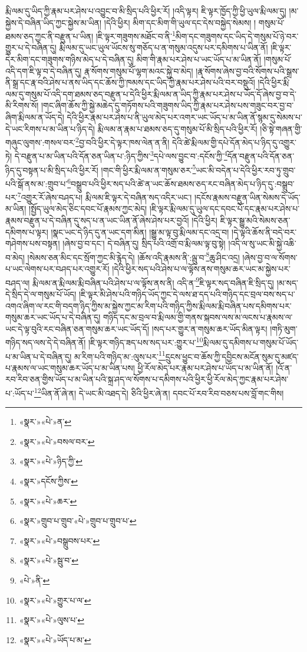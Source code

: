 རྨི་ལམ་དུ་ཡིད་ཀྱི་རྣམ་པར་ཤེས་པ་འབྱུང་བ་མི་སྲིད་པའི་ཕྱིར་རོ། །འདི་ལྟར། ཇི་ལྟར་ཁྱོད་ཀྱི་ཕྱི་ཡུལ་རྨི་ལམ་དུ། །མ་སྐྱེས་དེ་བཞིན་ཡིད་ཀྱང་སྐྱེས་མ་ཡིན། །དེའི་ཕྱིར། མིག་དང་མིག་གི་ཡུལ་དང་དེས་བསྐྱེད་སེམས། །
གསུམ་པོ་ཐམས་ཅད་ཀྱང་ནི་བརྫུན་པ་ཡིན། །ཇི་ལྟར་གཟུགས་མཐོང་བ་ནི་\footnote{«སྣར་»«པེ་»ན་}མིག་དང་གཟུགས་དང་ཡིད་དེ་གསུམ་པོ་ཉེ་བར་གྱུར་པ་དེ་བཞིན་དུ། རྨི་ལམ་དུ་ཡང་ཡུལ་ཡོངས་སུ་གཅོད་པ་ན་གསུམ་འདུས་པར་དམིགས་པ་ཡིན་ནོ། །ཇི་ལྟར་དེར་མིག་དང་གཟུགས་གཉིས་མེད་པ་དེ་བཞིན་དུ། མིག་གི་རྣམ་པར་ཤེས་པ་ཡང་ཡོད་པ་མ་ཡིན་ནོ། །གསུམ་པོ་འདི་དག་ཇི་ལྟ་བ་དེ་བཞིན་དུ། རྣ་སོགས་གསུམ་པོ་ལྷག་མའང་སྐྱེ་བ་མེད། །རྣ་སོགས་ཞེས་བྱ་བའི་སོགས་པའི་སྒྲས་ནི་སྒྲ་དང་རྣ་བའི་ཤེས་པ་ནས་ཡིད་དང་ཆོས་ཀྱི་ཁམས་དང་ཡིད་ཀྱི་རྣམ་པར་ཤེས་པའི་བར་བསྡུའོ། །དེའི་ཕྱིར་རྨི་ལམ་དུ་གསུམ་པོ་འདི་དག་ཐམས་ཅད་བརྫུན་པ་དེའི་ཕྱིར་རྨི་ལམ་ན་ཡིད་ཀྱི་རྣམ་པར་ཤེས་པ་ཡོད་དོ་ཞེས་བྱ་བ་དེ་མི་རིགས་སོ། །གང་ཞིག་ཆོས་ཀྱི་སྐྱེ་མཆེད་དུ་གཏོགས་པའི་གཟུགས་ཡིད་ཀྱི་རྣམ་པར་ཤེས་པས་གཟུང་བར་བྱ་བ་ཞིག་རྨི་ལམ་ན་ཡོད་དེ། དེའི་ཕྱིར་རྣམ་པར་ཤེས་པ་ནི་ཡུལ་མེད་པར་འགར་ཡང་ཡོད་པ་མ་ཡིན་ནོ་སྙམ་དུ་སེམས་པ་དེ་ཡང་རིགས་པ་མ་ཡིན་པ་ཉིད་དེ། རྨི་ལམ་ན་རྣམ་པ་ཐམས་ཅད་དུ་གསུམ་པོ་མི་སྲིད་པའི་ཕྱིར་རོ། །ཅི་སྟེ་གཞན་གྱི་གཞུང་ལུགས་:གསལ་བར་\footnote{«སྣར་»«པེ་»བསལ་བར་}བྱ་བའི་ཕྱིར་དེ་ལྟར་ཁས་ལེན་ན་ནི། དེའི་ཚེ་རྨི་ལམ་གྱི་དཔེ་དོན་མེད་པ་ཉིད་དུ་འགྱུར་ཏེ། དེ་བརྫུན་པ་མ་ཡིན་པའི་དོན་ཅན་ཡིན་པ་:ཉིད་ཀྱིས་\footnote{«སྣར་»«པེ་»ཉིད་ཀྱི་}དཔེ་ལས་བྱུང་བ་:དངོས་ཀྱི་\footnote{«སྣར་»དངོས་ཀྱིས་}དོན་བརྫུན་པའི་དོན་ཅན་ཉིད་དུ་བསྟན་པ་མི་སྲིད་པའི་ཕྱིར་རོ། །གང་གི་ཕྱིར་རྨི་ལམ་ན་གསུམ་ཅར་\footnote{«སྣར་»«པེ་»ཆར་}ཡང་མི་བདེན་པ་དེའི་ཕྱིར་རབ་ཏུ་གྲུབ་པའི་སྒོ་ནས་མ་:གྲུབ་པ་\footnote{«སྣར་»གྲུབ་པ་གྲུབ་«པེ་»གྲུབ་པ་གྲུབ་པ་}བསྒྲུབ་པའི་ཕྱིར་སད་པའི་ཚེ་ན་ཡང་ཆོས་ཐམས་ཅད་རང་བཞིན་མེད་པ་ཉིད་དུ་:བསྒྲུབ་པར་\footnote{«སྣར་»«པེ་»བསྒྲུབས་པར་}འགྱུར་རོ་ཞེས་བཤད་པ། རྨི་ལམ་ཇི་ལྟར་དེ་བཞིན་སད་འདིར་ཡང་། །དངོས་རྣམས་བརྫུན་ཡིན་སེམས་དེ་ཡོད་མ་ཡིན། །སྤྱོད་ཡུལ་མེད་ཅིང་དབང་པོ་རྣམས་ཀྱང་མེད། །ཇི་ལྟར་རྨི་ལམ་དུ་ཡུལ་དང་དབང་པོ་དང་རྣམ་པར་ཤེས་པ་རྣམས་བརྫུན་པ་དེ་བཞིན་དུ་སད་པ་ན་ཡང་ཡིན་ནོ་ཞེས་ཤེས་པར་བྱའོ། །དེའི་ཕྱིར། ཇི་ལྟར་སྒྱུ་མའི་སེམས་ཅན་དམིགས་པ་ལྟར། །སྣང་ཡང་དེ་ཉིད་དུ་ན་ཡང་དག་མིན། །སྒྱུ་མ་ལྟ་བུ་རྨི་ལམ་དང་འདྲ་བ། །དེ་ལྟའི་ཆོས་ནི་བདེ་བར་གཤེགས་པས་བསྟན། །ཞེས་བྱ་བ་དང་། དེ་བཞིན་དུ། སྲིད་པའི་འགྲོ་བ་རྨི་ལམ་ལྟ་བུ་སྟེ། །འདི་ལ་སུ་ཡང་མི་སྐྱེ་འཆི་བ་མེད། །སེམས་ཅན་མིང་དང་སྲོག་ཀྱང་མི་རྙེད་དེ། །ཆོས་འདི་རྣམས་ནི་:ལྦུ་བ་\footnote{«སྣར་»«པེ་»སྦུ་བ་}ཆུ་ཤིང་འདྲ། །ཞེས་བྱ་བ་ལ་སོགས་པ་ཡང་ལེགས་པར་བཤད་པར་འགྱུར་རོ། །དེའི་ཕྱིར་སད་པའི་ཤེས་པ་ལ་ལྟོས་ནས་གསུམ་ཆར་ཡང་མ་སྐྱེས་པར་བཤད་ལ། རྨི་ལམ་ན་རྨི་ལམ་རྨི་བཞིན་པའི་ཤེས་པ་ལ་ལྟོས་ནས་ནི། འདི་ན་\footnote{«པེ་»ནི་}ཇི་ལྟར་སད་བཞིན་ཇི་སྲིད་དུ། །མ་སད་དེ་སྲིད་དེ་ལ་གསུམ་པོ་ཡོད། །ཇི་ལྟར་མི་ཤེས་པའི་གཉིད་ཡོད་ཀྱང་དེ་ལས་ཐ་དད་པའི་གཉིད་དང་བྲལ་བས་སད་པ་འགའ་ཞིག་ལ་རང་གི་བདག་ཉིད་ཀྱིས་མ་སྐྱེས་ཀྱང་མ་རིག་པའི་གཉིད་ཀྱིས་རྨི་ལམ་རྨི་བཞིན་པས་དམིགས་པར་གསུམ་ཆར་ཡང་ཡོད་པ་དེ་བཞིན་དུ། གཉིད་དང་མ་བྲལ་བ་རྨི་ལམ་གྱི་གནས་སྐབས་ལས་མ་ལངས་པ་རྣམས་ལ་ཡང་དེ་ལྟ་བུའི་རང་བཞིན་ཅན་གསུམ་ཆར་ཡང་ཡོད་དོ། །སད་པར་གྱུར་ན་གསུམ་ཆར་ཡོད་མིན་ལྟར། །གཏི་མུག་གཉིད་སད་ལས་དེ་དེ་བཞིན་ནོ། །ཇི་ལྟར་གཉིད་ཟད་པས་སད་པར་:གྱུར་པ་\footnote{«སྣར་»«པེ་»གྱུར་པ་ལ་}རྨི་ལམ་དུ་དམིགས་པ་གསུམ་པོ་ཡོད་པ་མ་ཡིན་པ་དེ་བཞིན་དུ། མ་རིག་པའི་གཉིད་མ་:ལུས་པར་\footnote{«སྣར་»«པེ་»ལུས་པ་}དྲུངས་ཕྱུང་བ་ཆོས་ཀྱི་དབྱིངས་མངོན་སུམ་དུ་མཛད་པ་རྣམས་ལ་ཡང་གསུམ་ཆར་ཡོད་པ་མ་ཡིན་པས། ཕྱི་རོལ་མེད་པར་རྣམ་པར་ཤེས་པ་ཡོད་པ་མ་ཡིན་ནོ། །འོ་ན་རབ་རིབ་ཅན་གྱིས་ཡོད་པ་མ་ཡིན་པའི་སྐྲ་ཤད་ལ་སོགས་པ་དམིགས་པའི་ཕྱིར་ཕྱི་རོལ་མེད་ཀྱང་རྣམ་པར་ཤེས་པ་:ཡོད་པ་\footnote{«སྣར་»«པེ་»ཡོད་པ་མ་}ཡིན་ནོ་ཞེ་ན། དེ་ཡང་མི་འཐད་དེ། ཅིའི་ཕྱིར་ཞེ་ན། དབང་པོ་རབ་རིབ་བཅས་པས་བློ་གང་གིས། 